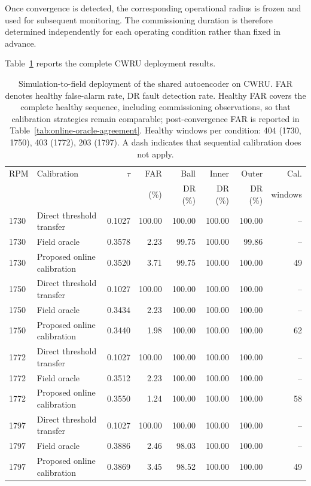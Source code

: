 \documentclass[numbered]{trbunofficial}
\begin{document}
Once convergence is detected, the corresponding operational radius is frozen
and used for subsequent monitoring. The commissioning duration is therefore
determined independently for each operating condition rather than fixed in
advance.

Table~\ref{tab:shared-deployment} reports the complete CWRU deployment
results.

\begin{table}[!ht]
\centering
\caption{Simulation-to-field deployment of the shared autoencoder on CWRU.
FAR denotes healthy false-alarm rate, DR fault detection rate. Healthy FAR
covers the complete healthy sequence, including commissioning observations,
so that calibration strategies remain comparable; post-convergence FAR is
reported in Table~\ref{tab:online-oracle-agreement}. Healthy windows per condition:
404 (1730, 1750), 403 (1772), 203 (1797). A dash indicates that sequential
calibration does not apply.}
\label{tab:shared-deployment}
\setlength{\tabcolsep}{4pt}
\begin{tabular}{@{}llrrrrrr@{}}
\toprule
RPM & Calibration & $\tau$ & FAR & Ball & Inner & Outer & Cal. \\
    &             &        & (\%) & DR (\%) & DR (\%) & DR (\%) & windows \\
\midrule

1730 & Direct threshold transfer  & 0.1027 & 100.00 & 100.00 & 100.00 & 100.00 & -- \\
1730 & Field oracle               & 0.3578 &   2.23 &  99.75 & 100.00 &  99.86 & -- \\
1730 & Proposed online calibration& 0.3520 &   3.71 &  99.75 & 100.00 & 100.00 & 49 \\

\addlinespace

1750 & Direct threshold transfer  & 0.1027 & 100.00 & 100.00 & 100.00 & 100.00 & -- \\
1750 & Field oracle               & 0.3434 &   2.23 & 100.00 & 100.00 & 100.00 & -- \\
1750 & Proposed online calibration& 0.3440 &   1.98 & 100.00 & 100.00 & 100.00 & 62 \\

\addlinespace

1772 & Direct threshold transfer  & 0.1027 & 100.00 & 100.00 & 100.00 & 100.00 & -- \\
1772 & Field oracle               & 0.3512 &   2.23 & 100.00 & 100.00 & 100.00 & -- \\
1772 & Proposed online calibration& 0.3550 &   1.24 & 100.00 & 100.00 & 100.00 & 58 \\

\addlinespace

1797 & Direct threshold transfer  & 0.1027 & 100.00 & 100.00 & 100.00 & 100.00 & -- \\
1797 & Field oracle               & 0.3886 &   2.46 &  98.03 & 100.00 & 100.00 & -- \\
1797 & Proposed online calibration& 0.3869 &   3.45 &  98.52 & 100.00 & 100.00 & 49 \\

\bottomrule
\end{tabular}
\end{table}
\end{document}
